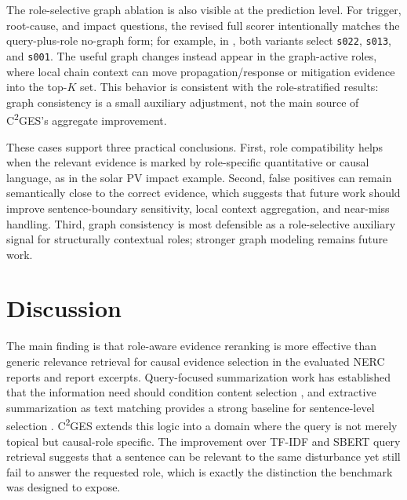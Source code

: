 \documentclass{ieeeaccess}
\begin{document}
The role-selective graph ablation is also visible at the prediction level. For trigger, root-cause, and impact questions, the revised full scorer intentionally matches the query-plus-role no-graph form; for example, in , both variants select \texttt{s022}, \texttt{s013}, and \texttt{s001}. The useful graph changes instead appear in the graph-active roles, where local chain context can move propagation/response or mitigation evidence into the top-\(K\) set. This behavior is consistent with the role-stratified results: graph consistency is a small auxiliary adjustment, not the main source of C\textsuperscript{2}GES's aggregate improvement.

These cases support three practical conclusions. First, role compatibility helps when the relevant evidence is marked by role-specific quantitative or causal language, as in the solar PV impact example. Second, false positives can remain semantically close to the correct evidence, which suggests that future work should improve sentence-boundary sensitivity, local context aggregation, and near-miss handling. Third, graph consistency is most defensible as a role-selective auxiliary signal for structurally contextual roles; stronger graph modeling remains future work.

\section{Discussion}

\label{sec:discussion}

The main finding is that role-aware evidence reranking is more effective than generic relevance retrieval for causal evidence selection in the evaluated NERC reports and report excerpts. Query-focused summarization work has established that the information need should condition content selection \cite{zhong2021qmsum}, and extractive summarization as text matching provides a strong baseline for sentence-level selection \cite{zhong2020extractive}. C\textsuperscript{2}GES extends this logic into a domain where the query is not merely topical but causal-role specific. The improvement over TF-IDF and SBERT query retrieval suggests that a sentence can be relevant to the same disturbance yet still fail to answer the requested role, which is exactly the distinction the benchmark was designed to expose.
\end{document}
